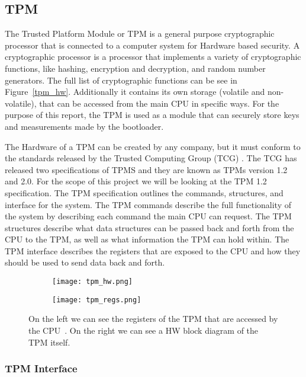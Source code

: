 \documentclass[../report.tex]{subfiles}
\begin{document}
\subsection{TPM}\label{sec:TPM}

The Trusted Platform Module\cite{TPM} or TPM is a general purpose cryptographic processor that is connected to a computer system for Hardware based security.
A cryptographic processor is a processor that implements a variety of
cryptographic functions, like hashing, encryption and decryption, and random
number generators. The full list of cryptographic functions can be see in
Figure~\ref{tpm_hw}.
Additionally it contains its own storage (volatile and non-volatile), that can be accessed from the main CPU in specific ways.
For the purpose of this report, the TPM is used as a module that can securely store keys and measurements made by the bootloader.

The Hardware of a TPM can be created by any company, but it must conform to the standards released by the Trusted Computing Group (TCG) \cite{TCG}.
The TCG has released two specifications of TPMS and they are known as TPMs version 1.2 and 2.0.
For the scope of this project we will be looking at the TPM 1.2 specification.
The TPM specification outlines the commands, structures, and interface for the system.
The TPM commands describe the full functionality of the system by describing each command the main CPU can request.
The TPM structures describe what data structures can be passed back and forth from the CPU to the TPM, as well as what information the TPM can hold within.
The TPM interface describes the registers that are exposed to the CPU and how they should be used to send data back and forth.

\begin{figure}
  \centering
\begin{subfigure}{.4\textwidth}
  \centering
  \texttt{[image: tpm\_hw.png]}
\end{subfigure}
\begin{subfigure}{.40\textwidth}
  \centering
  \texttt{[image: tpm\_regs.png]}
\end{subfigure}
\caption{On the left we can see the registers of the TPM that are accessed by the CPU~. On the right we can see a HW block diagram of the TPM itself\cite{tpm-slides}.}
\label{fig:tpm_hw}
\end{figure}


\subsubsection{TPM Interface}
\end{document}
